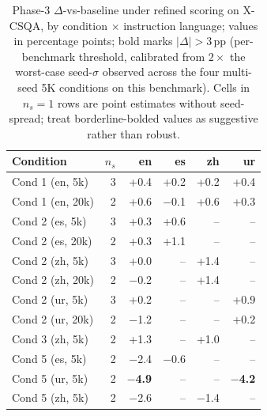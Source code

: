 \begin{table}[t]
  \centering
  \small
  \begin{tabular}{lrrrrr}
    \toprule
    Condition & $n_s$ & en & es & zh & ur \\
    \midrule
    Cond 1 (en, 5k) & 3 & +0.4 & +0.2 & +0.2 & +0.4 \\
    Cond 1 (en, 20k) & 2 & +0.6 & $-$0.1 & +0.6 & +0.3 \\
    Cond 2 (es, 5k) & 3 & +0.3 & +0.6 & -- & -- \\
    Cond 2 (es, 20k) & 2 & +0.3 & +1.1 & -- & -- \\
    Cond 2 (zh, 5k) & 3 & +0.0 & -- & +1.4 & -- \\
    Cond 2 (zh, 20k) & 2 & $-$0.2 & -- & +1.4 & -- \\
    Cond 2 (ur, 5k) & 3 & +0.2 & -- & -- & +0.9 \\
    Cond 2 (ur, 20k) & 2 & $-$1.2 & -- & -- & +0.2 \\
    Cond 3 (zh, 5k) & 2 & +1.3 & -- & +1.0 & -- \\
    Cond 5 (es, 5k) & 2 & $-$2.4 & $-$0.6 & -- & -- \\
    Cond 5 (ur, 5k) & 2 & \textbf{$-$4.9} & -- & -- & \textbf{$-$4.2} \\
    Cond 5 (zh, 5k) & 2 & $-$2.6 & -- & $-$1.4 & -- \\
    \bottomrule
  \end{tabular}
  \caption{Phase-3 $\Delta$-vs-baseline under refined scoring on \textsc{X-CSQA}, by condition $\times$ instruction language; values in percentage points; bold marks $|\Delta| > 3$\,pp (per-benchmark threshold, calibrated from $2 \times$ the worst-case seed-$\sigma$ observed across the four multi-seed 5K conditions on this benchmark). Cells in $n_s\!=\!1$ rows are point estimates without seed-spread; treat borderline-bolded values as suggestive rather than robust.}
  \label{tab:t4-xcsqa-delta}
\end{table}

